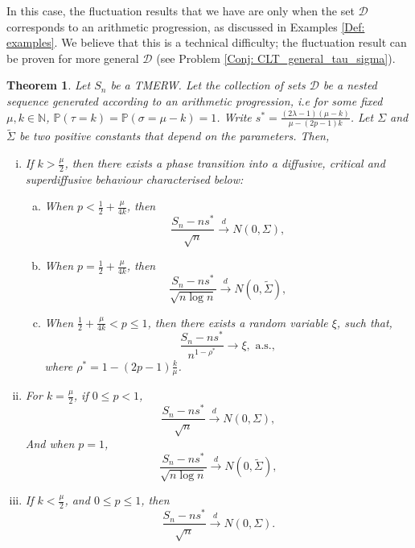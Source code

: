 \documentclass{article}
\numberwithin{equation}{section}
\newtheorem{theorem}{Theorem}[section]
\newcommand{\DD}{\mbox{${\mathcal D}$}}
\newcommand{\bN}{\mbox{${\mathbb N}$}}
\newcommand{\1}{\mathbf{1}}
\newcommand{\0}{\mathbf{0}}
\newcommand{\PP}{\mbox{${\mathbb P}$}}
\begin{document}
In this case, the fluctuation results that we have are only when the set $\DD$ corresponds to an arithmetic progression, as discussed in Examples \ref{Def: examples}. We believe that this is a technical difficulty; the fluctuation result can be proven for more general $\DD$ (see Problem \ref{Conj: CLT_general_tau_sigma}).
\begin{theorem}
\label{Thm: anamolous_diffusion_Dn_non_trivial}
Let $S_n$ be a TMERW. Let the collection of sets $\DD$ be a nested sequence generated according to an arithmetic progression, i.e for some fixed $\mu, k \in \bN$, $\PP \left(\tau =k\right)=\PP \left(\sigma =\mu-k\right)=1$. 
Write $ s^*=\frac{(2\lambda-1)(\mu-k)}{\mu - (2p-1)k}$. Let $\Sigma$ and $\widetilde{\Sigma}$ be two positive constants that depend on the parameters. Then,
\begin{enumerate}[i.]
\item If $k> \frac{\mu}{2}$, then there exists a phase transition into a diffusive, critical and superdiffusive behaviour characterised below:
\begin{enumerate}[a.]
\item When $p<\frac{1}{2}+\frac{\mu}{4k}$, then 
\begin{equation}
\label{Eq: CLT_renewal_sub_diffusive}
\frac{S_n -n s^*}{\sqrt{n}}\stackrel{d}{\longrightarrow} N (0, \Sigma),
\end{equation}
\item When $p= \frac{1}{2}+\frac{\mu}{4k}$, then 
\begin{equation}
\label{Eq: CLT_renewal_diffusive}
\frac{S_n- n s^* }{\sqrt{n \log n}}\stackrel{d}{\longrightarrow} N (0,\widetilde \Sigma),
\end{equation}
\item When $\frac{1}{2}+\frac{\mu}{4k} <p \le 1$, then there exists a random variable $\xi$, such that, 
\begin{equation}
\label{Eq: lim_renewal_super_diffusive}
\frac{S_n- n s^* }{n^{1-\rho^*}} \longrightarrow \xi, \text{ a.s.},
\end{equation}
where $\rho^*= 1- (2p-1)\frac{k}{\mu}$. 
\end{enumerate}
\item For $k =\frac{\mu}{2}$, if  $0 \le p <1$, 
\begin{equation}
\label{Eq: CLT_sqrt_n_equal parts memmory}
\frac{S_n -n s^*}{\sqrt{n}}\stackrel{d}{\longrightarrow} N (0, \Sigma),
\end{equation}
And when $p=1$,
\begin{equation}
\label{Eq: CLT_sqrt_n_logn_equal parts memmory}
\frac{S_n -n s^*}{\sqrt{n \log n}}\stackrel{d}{\longrightarrow} N (0, \widetilde\Sigma),
\end{equation}
\item If $k < \frac{\mu}{2}$, and $0 \le p \le 1$, then 
\begin{equation}
\label{Eq: CLT_sqrt_n_only}
\frac{S_n -n s^*}{\sqrt{n}}\stackrel{d}{\longrightarrow} N (0, \Sigma).
\end{equation}
\end{enumerate}
\end{theorem}
\end{document}
